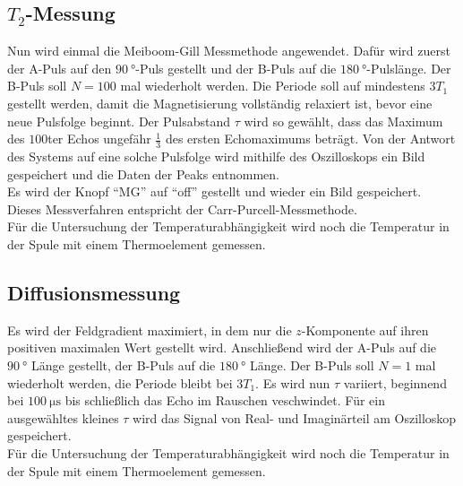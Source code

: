     \subsection{$T_2$-Messung}

        \noindent Nun wird einmal die Meiboom-Gill Messmethode angewendet. Dafür wird zuerst der A-Puls auf den $\SI{90}{\degree}$-Puls gestellt und der B-Puls auf die $\SI{180}{\degree}$-Pulslänge. Der 
        B-Puls soll $N= \num{100}$ mal wiederholt werden. Die Periode soll auf mindestens $3 T_1$ gestellt werden, damit die Magnetisierung vollständig relaxiert ist, bevor eine neue Pulsfolge beginnt. 
        Der Pulsabstand $\tau$ wird so gewählt, dass das Maximum des $\num{100}$ter Echos ungefähr $\frac{1}{3}$ des ersten Echomaximums beträgt. Von der Antwort des Systems auf eine solche Pulsfolge 
        wird mithilfe des Oszilloskops ein Bild gespeichert und die Daten der Peaks entnommen. \\ 
        Es wird der Knopf \enquote{MG} auf \enquote{off} gestellt und wieder ein Bild gespeichert. Dieses Messverfahren entspricht der Carr-Purcell-Messmethode. \\
        Für die Untersuchung der Temperaturabhängigkeit wird noch die Temperatur in der Spule mit einem Thermoelement gemessen.

    \subsection{Diffusionsmessung}

        \noindent Es wird der Feldgradient maximiert, in dem nur die $z$-Komponente auf ihren positiven maximalen Wert gestellt wird. Anschließend wird der A-Puls auf die $\SI{90}{\degree}$ Länge gestellt, 
        der B-Puls auf die $\SI{180}{\degree}$ Länge. Der B-Puls soll $N=1$ mal wiederholt werden, die Periode bleibt bei $3 T_1$. Es wird nun $\tau$ variiert, beginnend bei $\SI{100}{\micro\second}$ 
        bis schließlich das Echo im Rauschen veschwindet. Für ein ausgewähltes kleines $\tau$ wird das Signal von Real- und Imaginärteil am Oszilloskop gespeichert. \\
        Für die Untersuchung der Temperaturabhängigkeit wird noch die Temperatur in der Spule mit einem Thermoelement gemessen.